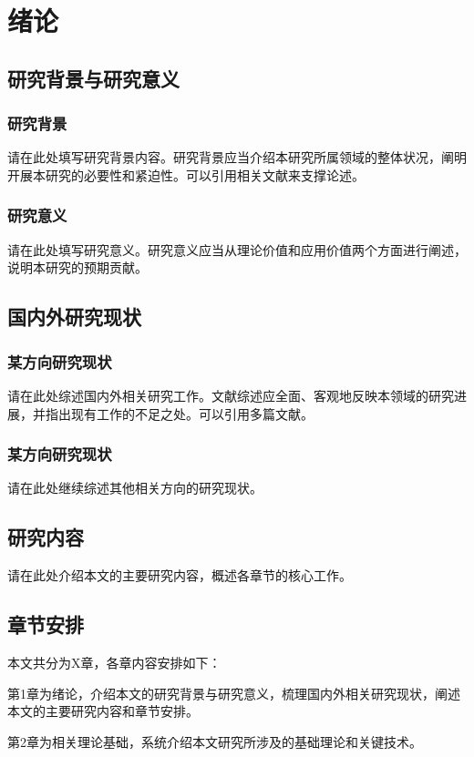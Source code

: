 
\chapter{绪论}\label{chap:intro}

\section{研究背景与研究意义}\label{sec:background}

\subsection{研究背景}\label{subsec:background}

请在此处填写研究背景内容。研究背景应当介绍本研究所属领域的整体状况，阐明开展本研究的必要性和紧迫性。可以引用相关文献\cite{ronneberger2015unet}来支撑论述。

\subsection{研究意义}\label{subsec:significance}

请在此处填写研究意义。研究意义应当从理论价值和应用价值两个方面进行阐述，说明本研究的预期贡献。

\section{国内外研究现状}\label{sec:related-work}

\subsection{某方向研究现状}\label{subsec:direction-a}

请在此处综述国内外相关研究工作。文献综述应全面、客观地反映本领域的研究进展，并指出现有工作的不足之处。可以引用多篇文献\cite{goodfellow2014gan,he2016resnet,pan2010survey}。

\subsection{某方向研究现状}\label{subsec:direction-b}

请在此处继续综述其他相关方向的研究现状。

\section{研究内容}\label{sec:research-content}

请在此处介绍本文的主要研究内容，概述各章节的核心工作。

\section{章节安排}\label{sec:structure}

本文共分为X章，各章内容安排如下：

第1章为绪论，介绍本文的研究背景与研究意义，梳理国内外相关研究现状，阐述本文的主要研究内容和章节安排。

第2章为相关理论基础，系统介绍本文研究所涉及的基础理论和关键技术。


